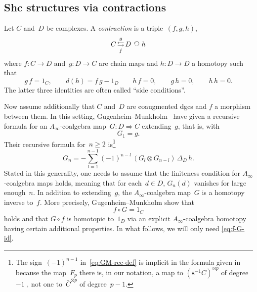 \documentclass[letterpaper]{amsart}
\numberwithin{equation}{section}
\theoremstyle{plain}
\theoremstyle{definition}
\theoremstyle{remark}
\let\newterm\emph
\def\Ainf{A_{\infty}}
\def\susp{\mathbf{s}}
\def\desusp{\susp^{-1}}
\def\selfmapright{\mathbin{\rotatebox{90}{$\circlearrowleft$}}}
\begin{document}
\subsection{Shc structures via contractions}
\label{sec:contractions}

Let $C$ and~$D$ be complexes. A \newterm{contraction} is a triple~$(f,g,h)$,
\begin{equation}
  C \mathop{\leftrightarrows}^{g}_{f} D \; \selfmapright \, h
\end{equation}
where $f\colon C\to D$ and~$g\colon D\to C$ are chain maps
and $h\colon D\to D$ a homotopy such that
\begin{equation}
  g\,f = 1_{C},
  \qquad
  d(h) = f\,g - 1_{D}
  \qquad
  h\,f = 0,
  \qquad
  g\,h = 0,
  \qquad
  h\,h = 0.
\end{equation}
The latter three identities are often called ``side conditions''.

Now assume additionally that $C$ and~$D$ are coaugmented dgcs and $f$ a morphism between them.
In this setting, Gugenheim--Munkholm~\cite[Thm~4.1$^{*}$]{GugenheimMunkholm:1974} have given a recursive formula
for an $\Ainf$-coalgebra map~$G\colon D\Rightarrow C$ extending~$g$, that is, with
\begin{equation}
  G_{1}=g.
\end{equation}
Their recursive formula for~$n\ge2$ is\footnote{%
  The sign~$(-1)^{n-1}$ in~\eqref{eq:GM-rec-def} is implicit in the formula given in~\cite[p.~26]{GugenheimMunkholm:1974}
  because the map~$\bar{F}_{p}$ there is, in our notation, a map to $(\desusp\bar{C})^{\otimes p}$ of degree~$-1$ ,
  not one to~$\bar C^{\otimes p}$ of degree~$p-1$.}
\begin{equation}
  \label{eq:GM-rec-def}
  G_{n} = -\sum_{l=1}^{n-1} (-1)^{n-l}\,(G_{l}\otimes G_{n-l})\,\Delta_{D}\,h.
\end{equation}
Stated in this generality, one needs to assume that the finiteness condition for $\Ainf$-coalgebra maps holds,
meaning that for each~$d\in D$, $G_{n}(d)$ vanishes for large enough~$n$.
In addition to extending~$g$, the $\Ainf$-coalgebra map~$G$ is a homotopy inverse to~$f$.
More precisely, Gugenheim--Munkholm show that
\begin{equation}
  \label{eq:f-G-id}
  f\circ G = 1_{C}
\end{equation}
holds and that $G\circ f$ is homotopic to~$1_{D}$ via an explicit $\Ainf$-coalgebra homotopy
having certain additional properties. In what follows, we will only need \eqref{eq:f-G-id}.
\end{document}
